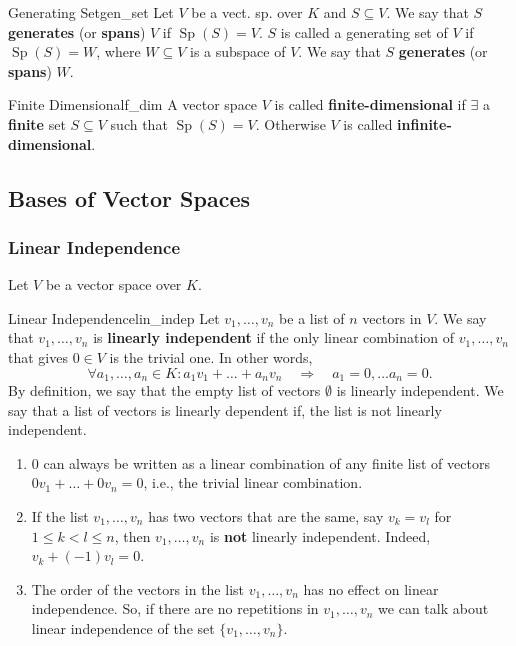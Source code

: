\begin{definition}{Generating Set}{gen_set}
	Let $V$ be a vect. sp. over $K$ and $S \subseteq V$. We say that $S$ \textbf{generates} (or \textbf{spans}) $V$ if $\operatorname{Sp}(S) = V$. $S$ is called a generating set of $V$ if $\operatorname{Sp}(S) = W$, where $W \subseteq V$ is a subspace of $V$. We say that $S$ \textbf{generates} (or \textbf{spans}) $W$.
\end{definition}

\begin{definition}{Finite Dimensional}{f_dim}
	A vector space $V$ is called \textbf{finite-dimensional} if $\exists$ a \textbf{finite} set $S \subseteq V$ such that $\operatorname{Sp}(S) = V$. Otherwise $V$ is called \textbf{infinite-dimensional}.
\end{definition}

\subsection{Bases of Vector Spaces}

\subsubsection{Linear Independence}
Let $V$ be a vector space over $K$.

\begin{definition}{Linear Independence}{lin_indep}
	Let $v_1, \hdots , v_n$ be a list of $n$ vectors in $V$. We say that $v_1, \hdots , v_n$ is \textbf{linearly independent} if the only linear combination of $v_1, \hdots , v_n$ that gives $0 \in V$ is the trivial one. In other words,
	\[
		\forall a_1, \hdots , a_n \in K : a_1v_1 + \hdots + a_n v_n \quad \Longrightarrow \quad a_1 = 0, \hdots a_n = 0.
	\]
	By definition, we say that the empty list of vectors $\emptyset$ is linearly independent.
	We say that a list of vectors is linearly dependent if, the list is not linearly independent.
\end{definition}

\begin{remark}
	\begin{enumerate}
		\item[(1)] 0 can always be written as a linear combination of any finite list of vectors $0 v_1 + \hdots + 0 v_n = 0$, i.e., the trivial linear combination.
		\item[(2)] If the list $v_1, \hdots , v_n$ has two vectors that are the same, say $v_k = v_l$ for $1 \leq k < l \leq n$, then $v_1, \hdots , v_n$ is \textbf{not} linearly independent. Indeed, $v_k + (-1) v_l = 0$.
		\item[(3)] The order of the vectors in the list $v_1, \hdots , v_n$ has no effect on linear independence. So, if there are no repetitions in $v_1, \hdots , v_n$ we can talk about linear independence of the set $\{v_1, \hdots , v_n\}$.
	\end{enumerate}
\end{remark}

